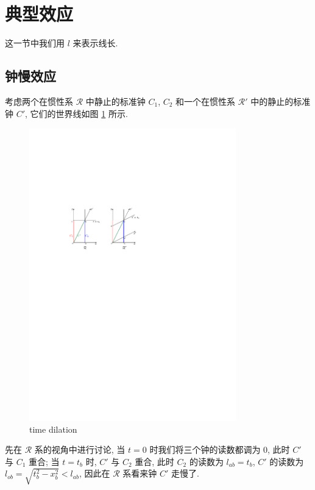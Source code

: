 \section{典型效应}
这一节中我们用 $ l $ 来表示线长.
\subsection{钟慢效应}
考虑两个在惯性系 $ \mathcal{R} $ 中静止的标准钟 $ C_1 $, $ C_2 $ 和一个在惯性系 $ \mathcal{R}' $ 中的静止的标准钟 $ C' $, 它们的世界线如图 \ref{time dilation} 所示.

\begin{figure}[htbp]
    \centering
    \includegraphics[width=0.8\textwidth]{pic/time dilation.pdf}
    \caption{time dilation}
    \label{time dilation}
\end{figure}

先在 $ \mathcal{R} $ 系的视角中进行讨论, 当 $ t=0 $ 时我们将三个钟的读数都调为 $ 0 $, 此时 $ C' $ 与 $ C_1 $ 重合; 当 $ t=t_b $ 时, $ C' $ 与 $ C_2 $ 重合, 此时 $ C_2 $ 的读数为 $ l_{ab}=t_b$, $ C' $ 的读数为 $ l_{ob}=\sqrt{t_b^2-x_b^2}<l_{ab}$, 因此在 $ \mathcal{R} $ 系看来钟 $ C' $ 走慢了.

